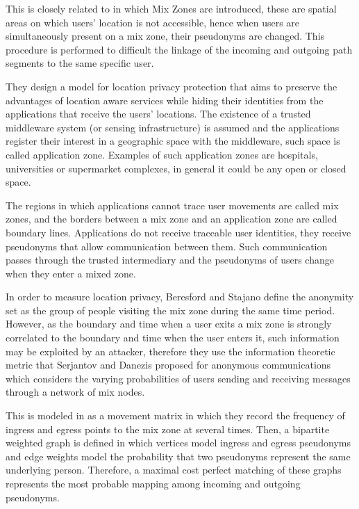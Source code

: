 \documentclass{llncs}
\begin{document}
This is closely related to \cite{Beresford2003} in which Mix Zones are introduced, these are spatial areas on which users' location is not accessible, hence when users are simultaneously present on a mix zone, their pseudonyms are changed. This procedure is performed to difficult the linkage of the incoming and outgoing path segments to the same specific user.

They design a model for location privacy protection that aims to preserve the advantages of location aware services while hiding their identities from the applications that receive the users' locations. 
The existence of a trusted middleware system (or sensing infrastructure) is assumed and the applications register their interest in a geographic space with the middleware, such space is called application zone. Examples of such application zones are hospitals, universities or supermarket complexes, in general it could be any open or closed space.

The regions in which applications cannot trace user movements are called mix zones, and the borders between a mix zone and an application zone are called boundary lines.
Applications do not receive traceable user identities, they receive pseudonyms that allow communication between them. Such communication passes through the trusted intermediary and the pseudonyms of users change when they enter a mixed zone.


In order to measure location privacy, Beresford and Stajano \cite{Beresford04mixzones} define the anonymity set as the group of people visiting the mix zone during the same time period. However, as the boundary and time when a user exits a mix zone is strongly correlated to the boundary and time when the user enters it, such information may be exploited by an attacker, therefore they use the information theoretic metric that Serjantov and Danezis \cite{Serjantov2002} proposed for anonymous communications which considers the varying probabilities of users sending and receiving messages through a network of mix nodes.


This is modeled in \cite{Beresford04mixzones} as a movement matrix in which they record the frequency of ingress and egress points to the mix zone at several times.
Then, a bipartite weighted graph is defined in which vertices model ingress and egress pseudonyms and edge weights
model the probability that two pseudonyms represent the same underlying person. Therefore, a maximal cost perfect matching of these graphs represents the most probable mapping among incoming and outgoing pseudonyms.
\end{document}
